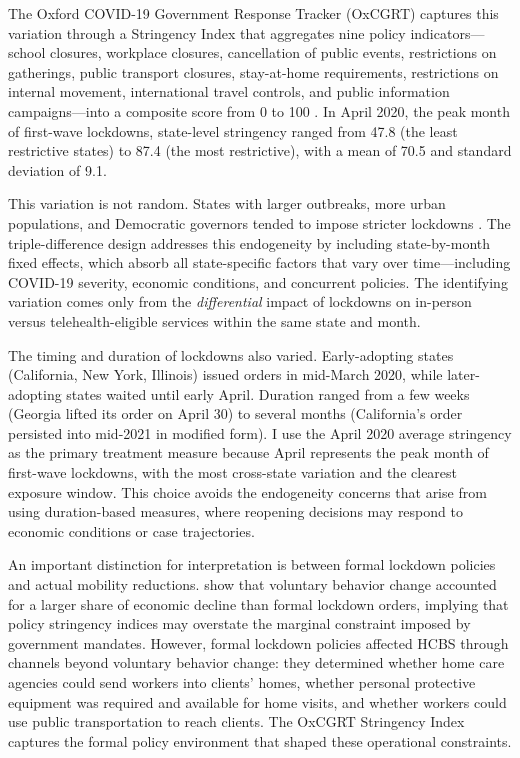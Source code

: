 \documentclass[12pt]{article}
\begin{document}
The Oxford COVID-19 Government Response Tracker (OxCGRT) captures this variation through a Stringency Index that aggregates nine policy indicators---school closures, workplace closures, cancellation of public events, restrictions on gatherings, public transport closures, stay-at-home requirements, restrictions on internal movement, international travel controls, and public information campaigns---into a composite score from 0 to 100 \citep{hale2021global}. In April 2020, the peak month of first-wave lockdowns, state-level stringency ranged from 47.8 (the least restrictive states) to 87.4 (the most restrictive), with a mean of 70.5 and standard deviation of 9.1.

This variation is not random. States with larger outbreaks, more urban populations, and Democratic governors tended to impose stricter lockdowns \citep{adolph2021}. The triple-difference design addresses this endogeneity by including state-by-month fixed effects, which absorb all state-specific factors that vary over time---including COVID-19 severity, economic conditions, and concurrent policies. The identifying variation comes only from the \textit{differential} impact of lockdowns on in-person versus telehealth-eligible services within the same state and month.

The timing and duration of lockdowns also varied. Early-adopting states (California, New York, Illinois) issued orders in mid-March 2020, while later-adopting states waited until early April. Duration ranged from a few weeks (Georgia lifted its order on April 30) to several months (California's order persisted into mid-2021 in modified form). I use the April 2020 average stringency as the primary treatment measure because April represents the peak month of first-wave lockdowns, with the most cross-state variation and the clearest exposure window. This choice avoids the endogeneity concerns that arise from using duration-based measures, where reopening decisions may respond to economic conditions or case trajectories.

An important distinction for interpretation is between formal lockdown policies and actual mobility reductions. \citet{goolsbee2021fear} show that voluntary behavior change accounted for a larger share of economic decline than formal lockdown orders, implying that policy stringency indices may overstate the marginal constraint imposed by government mandates. However, formal lockdown policies affected HCBS through channels beyond voluntary behavior change: they determined whether home care agencies could send workers into clients' homes, whether personal protective equipment was required and available for home visits, and whether workers could use public transportation to reach clients. The OxCGRT Stringency Index captures the formal policy environment that shaped these operational constraints.
\end{document}
